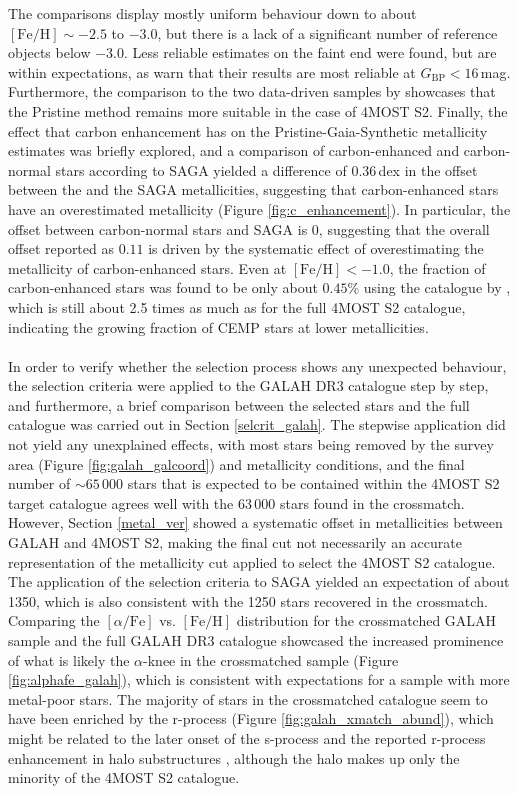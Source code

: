 \documentclass[a4paper,11pt]{article}
\begin{document}
%
The comparisons display mostly uniform behaviour down to about $\mathrm{[Fe/H]}\sim-2.5$ to $-3.0$, but there is a lack of a significant number of reference objects below $-3.0$. Less reliable estimates on the faint end were found, but are within expectations, as \citet{pristinegaia} warn that their results are most reliable at $G_\mathrm{BP}<16$\,mag. Furthermore, the comparison to the two data-driven samples by \citet{andrae23} showcases that the Pristine method remains more suitable in the case of 4MOST S2. Finally, the effect that carbon enhancement has on the Pristine-Gaia-Synthetic metallicity estimates was briefly explored, and a comparison of carbon-enhanced and carbon-normal stars according to SAGA yielded a difference of 0.36\,dex in the offset between the \citet{pristinegaia} and the SAGA metallicities, suggesting that carbon-enhanced stars have an overestimated metallicity (Figure \ref{fig:c_enhancement}). In particular, the offset between carbon-normal stars and SAGA is 0, suggesting that the overall offset reported as $0.11$ is driven by the systematic effect of overestimating the metallicity of carbon-enhanced stars. Even at $\mathrm{[Fe/H]}<-1.0$, the fraction of carbon-enhanced stars was found to be only about $0.45$\% using the catalogue by \citet{lucey23}, which is still about 2.5 times as much as for the full 4MOST S2 catalogue, indicating the growing fraction of CEMP stars at lower metallicities.\\ \\
%
In order to verify whether the selection process shows any unexpected behaviour, the selection criteria were applied to the GALAH DR3 catalogue step by step, and furthermore, a brief comparison between the selected stars and the full catalogue was carried out in Section \ref{selcrit_galah}. The stepwise application did not yield any unexplained effects, with most stars being removed by the survey area (Figure \ref{fig:galah_galcoord}) and metallicity conditions, and the final number of ${\sim}65\,000$ stars that is expected to be contained within the 4MOST S2 target catalogue agrees well with the 63\,000 stars found in the crossmatch. However, Section \ref{metal_ver} showed a systematic offset in metallicities between GALAH and 4MOST S2, making the final cut not necessarily an accurate representation of the metallicity cut applied to select the 4MOST S2 catalogue. The application of the selection criteria to SAGA yielded an expectation of about 1350, which is also consistent with the 1250 stars recovered in the crossmatch. Comparing the $[\alpha/\mathrm{Fe}]$ vs. $\mathrm{[Fe/H]}$ distribution for the crossmatched GALAH sample and the full GALAH DR3 catalogue showcased the increased prominence of what is likely the $\alpha$-knee in the crossmatched sample (Figure \ref{fig:alphafe_galah}), which is consistent with expectations for a sample with more metal-poor stars. The majority of stars in the crossmatched catalogue seem to have been enriched by the r-process (Figure \ref{fig:galah_xmatch_abund}), which might be related to the later onset of the s-process \citep{simmerer04,kappeler11} and the reported r-process enhancement in halo substructures \citep{matsuno21,roederer18}, although the halo makes up only the minority of the 4MOST S2 catalogue. \\ \\
\end{document}
